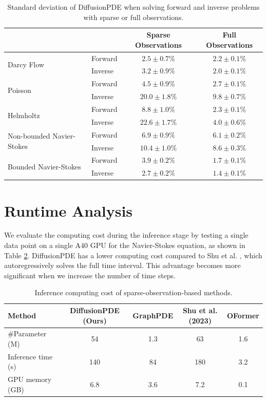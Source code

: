 \begin{table}[H]
    \caption{Standard deviation of DiffusionPDE when solving forward and inverse problems with sparse or full observations.}
    \label{table:sd}
    \centering
    \begin{tabular}{p{2cm}lcc}
        \toprule
        & & Sparse Observations & Full Observations \\
        \midrule
        \multirow{2}{2cm}{Darcy Flow} & Forward & $2.5\pm 0.7\%$ & $2.2 \pm 0.1\%$ \\
        & Inverse & $3.2\pm 0.9\%$ & $2.0\pm 0.1\%$ \\
        \midrule
        \multirow{2}{2cm}{Poisson} & Forward & $4.5\pm 0.9\%$ & $2.7\pm 0.1\%$ \\
        & Inverse & $20.0\pm 1.8\%$ & $9.8\pm 0.7\%$ \\
        \midrule
        \multirow{2}{2cm}{Helmholtz} & Forward & $8.8\pm 1.0\%$ & $2.3\pm 0.1\%$ \\
        & Inverse & $22.6\pm 1.7\%$ & $4.0\pm 0.6\%$ \\
        \midrule
        \multirow{2}{2cm}{Non-bounded Navier-Stokes} & Forward & $6.9\pm 0.9\%$ & $6.1\pm 0.2\%$ \\
        & Inverse & $10.4\pm 1.0\%$ & $8.6\pm 0.3\%$ \\
        \midrule
        \multirow{2}{2cm}{Bounded Navier-Stokes} & Forward & $3.9\pm 0.2\%$ & $1.7\pm 0.1\%$ \\
        & Inverse & $2.7\pm 0.2\%$ & $1.4\pm 0.1\%$ \\
        \bottomrule
    \end{tabular}
\end{table}
\vspace{-0.5em}

\section{Runtime Analysis}\label{sec:runtime}
We evaluate the computing cost during the inference stage by testing a single data point on a single A40 GPU for the Navier-Stokes equation, as shown in Table \ref{table:cost}. DiffusionPDE has a lower computing cost compared to Shu et al. \cite{shu2023physics}, which autoregressively solves the full time interval. This advantage becomes more significant when we increase the number of time steps.

\begin{table}[H]
  \caption{Inference computing cost of sparse-observation-based methods.}
  \label{table:cost}
  \centering
  \begin{tabular}{lcccc}
    \toprule
    Method & DiffusionPDE (Ours) & GraphPDE & Shu et al. (2023) & OFormer \\
    \midrule
    \#Parameter (M) & 54 & 1.3 & 63 & 1.6 \\
    Inference time (s) & 140 & 84 & 180 & 3.2 \\
    GPU memory (GB) & 6.8 & 3.6 & 7.2 & 0.1 \\
    \bottomrule
  \end{tabular}
\end{table}

